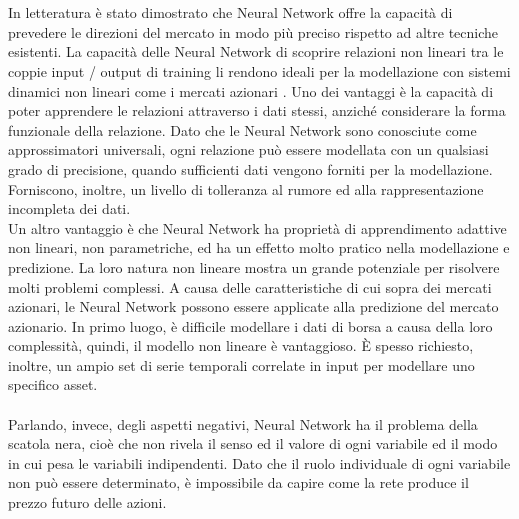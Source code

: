 \documentclass[a4paper,12pt]{report}
\begin{document}
\\~\\In letteratura è stato dimostrato che Neural Network offre la capacità di prevedere le direzioni del mercato in modo più preciso rispetto ad altre tecniche esistenti. La capacità delle Neural Network di scoprire relazioni non lineari tra le coppie input / output di training li rendono ideali per la modellazione con sistemi dinamici non lineari come i mercati azionari \cite{nn1}. Uno dei vantaggi è la capacità di poter apprendere le relazioni attraverso i dati stessi, anziché considerare la forma funzionale della relazione. Dato che le Neural Network sono conosciute come approssimatori universali, ogni relazione può essere modellata con un qualsiasi grado di precisione, quando sufficienti dati vengono forniti per la modellazione. Forniscono, inoltre, un livello di tolleranza al rumore ed alla rappresentazione incompleta dei dati.\\
Un altro vantaggio è che Neural Network ha proprietà di apprendimento adattive non lineari, non parametriche, ed ha un effetto molto pratico nella modellazione e predizione. La loro natura non lineare mostra un grande potenziale per risolvere molti problemi complessi. A causa delle caratteristiche di cui sopra dei mercati azionari, le Neural Network possono essere applicate alla predizione del mercato azionario. In primo luogo, è difficile modellare i dati di borsa a causa della loro complessità, quindi, il modello non lineare è vantaggioso. È spesso richiesto, inoltre, un ampio set di serie temporali correlate in input per modellare uno specifico asset.\\~\\Parlando, invece, degli aspetti negativi, Neural Network ha il problema della scatola nera, cioè che non rivela il senso ed il valore di ogni variabile ed il modo in cui pesa le variabili indipendenti\cite{nn1}. Dato che il ruolo individuale di ogni variabile non può essere determinato, è impossibile da capire come la rete produce il prezzo futuro delle azioni.\\
\end{document}
